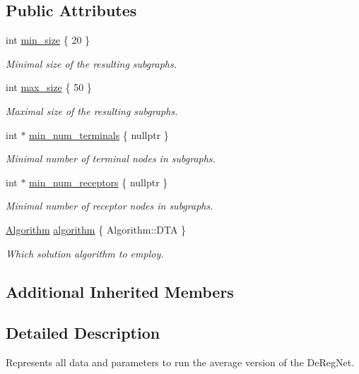 \subsection*{Public Attributes}
\begin{DoxyCompactItemize}
\item 
int \hyperlink{classderegnet_1_1AvgdrgntData_a733e0cd627433fca043a7f9b70af18c3}{min\+\_\+size} \{ 20 \}
\begin{DoxyCompactList}\small\item\em Minimal size of the resulting subgraphs. \end{DoxyCompactList}\item 
int \hyperlink{classderegnet_1_1AvgdrgntData_a9e844158e12d5e1c4d519c492cffeb17}{max\+\_\+size} \{ 50 \}
\begin{DoxyCompactList}\small\item\em Maximal size of the resulting subgraphs. \end{DoxyCompactList}\item 
int $\ast$ \hyperlink{classderegnet_1_1AvgdrgntData_a38c3bdd86fa3d6ef16ca5db821ca12d2}{min\+\_\+num\+\_\+terminals} \{ nullptr \}
\begin{DoxyCompactList}\small\item\em Minimal number of terminal nodes in subgraphs. \end{DoxyCompactList}\item 
int $\ast$ \hyperlink{classderegnet_1_1AvgdrgntData_a908acb714a65fd9ec4c278fa08150d96}{min\+\_\+num\+\_\+receptors} \{ nullptr \}
\begin{DoxyCompactList}\small\item\em Minimal number of receptor nodes in subgraphs. \end{DoxyCompactList}\item 
\hyperlink{namespacederegnet_ad59156f873b7ab02d384164b900cd874}{Algorithm} \hyperlink{classderegnet_1_1AvgdrgntData_aa75d6acc2d63aa589651c705eaf89280}{algorithm} \{ Algorithm\+::\+D\+TA \}
\begin{DoxyCompactList}\small\item\em Which solution algorithm to employ. \end{DoxyCompactList}\end{DoxyCompactItemize}
\subsection*{Additional Inherited Members}


\subsection{Detailed Description}
Represents all data and parameters to run the average version of the De\+Reg\+Net. 

